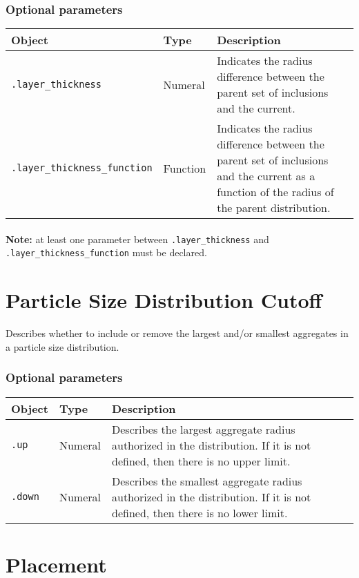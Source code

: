 \documentclass[10pt]{article}
\begin{document}
\subsubsection*{Optional parameters}

\begin{tabularx}{\textwidth}{llX}
\hline 
Object & Type & Description \\ 
\hline 
\verb+.layer_thickness+ & Numeral & Indicates the radius difference between the parent set of inclusions and the current. \\ 
\verb+.layer_thickness_function+ & Function & Indicates the radius difference between the parent set of inclusions and the current as a function of the radius of the parent distribution. \\ 
\hline 
\end{tabularx}

\paragraph{} \textbf{Note:} at least one parameter between \verb+.layer_thickness+  and \verb+.layer_thickness_function+ must be declared.

\section{Particle Size Distribution Cutoff}

Describes whether to include or remove the largest and/or smallest aggregates in a particle size distribution.

\subsubsection*{Optional parameters}

\begin{tabularx}{\textwidth}{llX}
\hline 
Object & Type & Description \\ 
\hline 
\verb+.up+ & Numeral & Describes the largest aggregate radius authorized in the distribution. If it is not defined, then there is no upper limit.\\
\verb+.down+ & Numeral & Describes the smallest aggregate radius authorized in the distribution. If it is not defined, then there is no lower limit.\\
\hline 
\end{tabularx}

\section{Placement}
\end{document}
